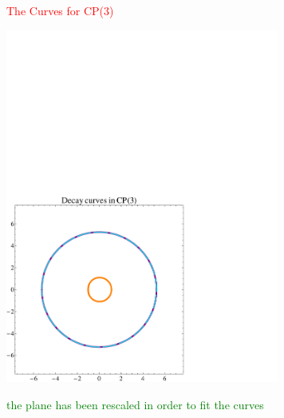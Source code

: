 \documentclass[12pt,letterpaper,landscape,KOMA,smallheadings,calcdimensions,display]{powersem}
\begin{document}
\begin{slide}

\centerline{\textcolor{red}{\Large The Curves for CP(3)}}

\vspace{-4.5cm}
\begin{center}
\hspace{2.5cm}
\includegraphics[width=9.0cm]{ccp3.pdf}
\end{center}

\centerline{\textcolor{green}{\small the plane has been rescaled in order to fit the curves}}

\end{slide}
\end{document}
